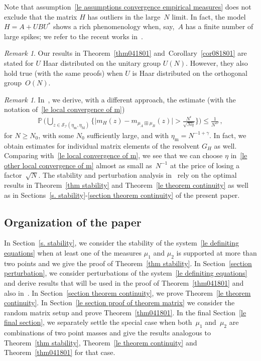 \documentclass[10pt,reqno]{amsart}
\numberwithin{equation}{section}
\theoremstyle{plain}
\newcounter{kevin}
\numberwithin{kevin}{section}
\theoremstyle{remark}
\newtheorem{remark}[kevin]{Remark}
\begin{document}
 Note that assumption~\eqref{le assumptions convergence empirical measures} does not exclude that the matrix $H$ has outliers in the large~$N$ limit. In fact, the model $H=A+UBU^*$ shows a rich phenomenology when, say,~$A$ has a finite number of large spikes; we refer to the recent works in~\cite{BBCF,BN11,C13,Kargin}. 

\begin{remark} Our results in Theorem~\ref{thm041801} and~Corollary~\ref{cor081801} are stated for $U$ Haar distributed on the unitary group $U(N)$. However, they also hold true (with the same proofs) when $U$ is Haar distributed on the orthogonal group~$O(N)$.
\end{remark}

\begin{remark}\label{remark:companion}
 In~\cite{BES15-2}, we derive, with a different approach, the estimate (with the notation of~\eqref{le local convergence of m})
 \begin{align}\label{le other local convergence of m}
\mathbb{P}\,\bigg(\bigcup_{z\in\mathcal{S}_{\mathcal{I}}(\eta_\mathrm{m},\eta_{\mathrm{M}})}\bigg\{\big|m_H(z)-m_{\mu_A\boxplus \mu_B}(z)\big|> \frac{N^{\epsilon}}{\sqrt{N\eta}}\bigg\}\bigg)\le \frac{1}{N^D}\,,
\end{align}
for $N\ge N_0$, with some $N_0$ sufficiently large, and with $\eta_{\mathrm{m}}=N^{-1+\gamma}$. In fact, we obtain estimates for individual matrix elements of the resolvent $G_{H}$ as well. Comparing with~\eqref{le local convergence of m}, we see that we can choose $\eta$ in~\eqref{le other local convergence of m} almost as small as~$N^{-1}$ at the price of losing a factor~$\sqrt{N}$.  The stability and perturbation analysis in~\cite{BES15-2} rely on the optimal results in Theorem~\ref{thm stability} and Theorem~\ref{le theorem continuity} as well as in Sections~\ref{s. stability}-\ref{section theorem continuity} of the present paper.

\end{remark}


\subsection{Organization of the paper}
In Section~\ref{s. stability}, we consider the stability of the system~\eqref{le definiting equations} when at least one of the measures $\mu_1$ and $\mu_2$ is supported at more than two points and we give the proof of Theorem~\ref{thm stability}. In Section~\ref{section perturbation}, we consider perturbations of the system~\eqref{le definiting equations} and derive results that will be used in the proof of Theorem~\ref{thm041801} and also in~\cite{BES15-2}. In Section~\ref{section theorem continuity}, we prove Theorem~\ref{le theorem continuity}. In Section~\ref{le section proof of theorem matrix} we consider the random matrix setup and prove Theorem~\ref{thm041801}. In the final Section~\ref{le final section}, we separately settle the special case when both~$\mu_1$ and~$\mu_2$ are combinations of two point masses and give the results analogous to Theorem~\ref{thm stability}, Theorem~\ref{le theorem continuity} and Theorem~\ref{thm041801} for that case.
\end{document}
